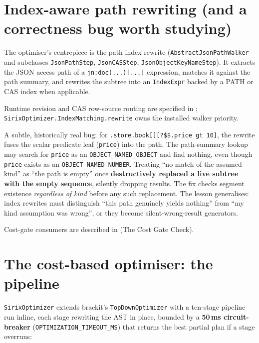 \documentclass[11pt,a4paper,oneside]{report}
\theoremstyle{sirixthm}
\newcommand{\code}[1]{\texttt{#1}}
\begin{document}
\section{Index-aware path rewriting (and a correctness bug worth studying)}

The optimiser's centrepiece is the path-index rewrite (\code{AbstractJsonPathWalker} and
subclasses \code{JsonPathStep}, \code{JsonCASStep}, \code{JsonObjectKeyNameStep}). It extracts
the JSON access path of a \code{jn:doc(...)[...]} expression, matches it against the path
summary, and rewrites the subtree into an \code{IndexExpr} backed by a PATH or CAS index when
applicable.

Runtime revision and CAS row-source routing are specified in
; \code{SirixOptimizer.IndexMatching.rewrite}
owns the installed walker priority.

A subtle, historically real bug: for \code{.store.book[][?\$\$.price gt 10]}, the rewrite
fuses the scalar predicate leaf (\code{price}) into the path. The path-summary lookup may
search for \code{price} as an \code{OBJECT\_NAMED\_OBJECT} and find nothing, even though
\code{price} exists as an \code{OBJECT\_NAMED\_NUMBER}. Treating ``no match of the assumed
kind'' as ``the path is empty'' once \textbf{destructively replaced a live subtree with the
empty sequence}, silently dropping results. The fix checks segment existence \emph{regardless
of kind} before any such replacement. The lesson generalises: index rewrites must distinguish
``this path genuinely yields nothing'' from ``my kind assumption was wrong'', or they become
silent-wrong-result generators.

Cost-gate consumers are described in 
(The Cost Gate Check).

\section{The cost-based optimiser: the pipeline}
\label{sec:optpipeline}

\code{SirixOptimizer} extends brackit's \code{TopDownOptimizer} with a ten-stage pipeline run inline,
each stage rewriting the AST in place, bounded by a \textbf{50\,ms circuit-breaker}
(\code{OPTIMIZATION\_TIMEOUT\_MS}) that returns the best partial plan if a stage overruns:
\end{document}
